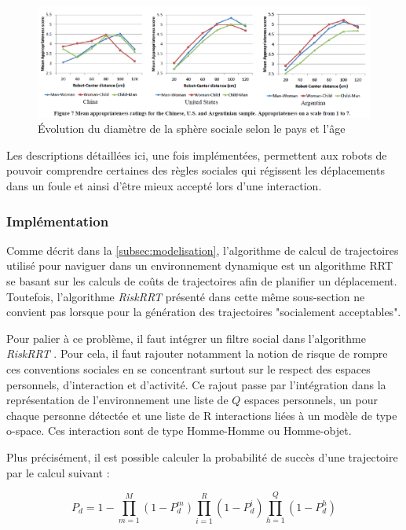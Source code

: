 \begin{figure}[ht!]
    \centering
    \includegraphics[width=\linewidth]{Rapport/images/distance_sociale_fonction_pays.PNG}
    \caption{Évolution du diamètre de la sphère sociale selon le pays et l'âge}
    \label{fig:diametre_pays_age}
\end{figure}

Les descriptions détaillées ici, une fois implémentées, permettent aux robots de pouvoir comprendre certaines des règles sociales qui régissent les déplacements dans un foule et ainsi d'être mieux accepté lors d'une interaction.

\subsubsection{Implémentation}

Comme décrit dans la \autoref{subsec:modelisation}, l'algorithme de calcul de trajectoires utilisé pour naviguer dans un environnement dynamique est un algorithme RRT se basant sur les calculs de coûts de trajectoires afin de planifier un déplacement. Toutefois, l'algorithme \textit{RiskRRT} présenté dans cette même sous-section ne convient pas lorsque pour la génération des trajectoires "socialement acceptables".

Pour palier à ce problème, il faut intégrer un filtre social dans l'algorithme \textit{RiskRRT} \cite{spalanzani_contribution_2015}. Pour cela, il faut rajouter notamment la notion de risque de rompre ces conventions sociales en se concentrant surtout sur le respect des espaces personnels, d'interaction et d'activité. Ce rajout passe par l'intégration dans la représentation de l'environnement une liste de $Q$ espaces personnels, un pour chaque personne détectée et une liste de R interactions liées à un modèle de type o-space. Ces interaction sont de type Homme-Homme ou Homme-objet.

Plus précisément, il est possible calculer la probabilité de succès d'une trajectoire par le calcul suivant :

\begin{equation}
    P_d = 1 - \prod\limits_{m=1}^M (1 - P^m_d) \prod\limits_{i=1}^R (1 - P^i_d) \prod\limits_{h=1}^Q (1 - P^h_d)
\end{equation} 

